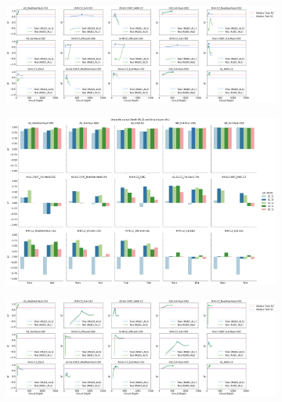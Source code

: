 \documentclass[journal=jacsat,manuscript=article]{achemso}
\begin{document}
\begin{figure}[H]
\begin{subfigure}[b]{0.49\textwidth}
		\caption{}
		\label{fig:16qubit_Quadratic_RUD_AL}
	\end{subfigure}
	\hfill
	\begin{subfigure}[b]{0.49\textwidth}
		\centering
		\includegraphics[width=\linewidth]{../images/Function_Fitting/quadratic_circuitdepth_vs_R2}
		\caption{}
		\label{fig:quadratic_circuitdepth_vs_R2}
	\end{subfigure}
	\hfill		
	\begin{subfigure}[b]{0.49\textwidth}
		\centering
		\includegraphics[width=\linewidth]{../images/Function_Fitting/sixteenqubit/16qubit_Linear_RUD_AL}
		\caption{}
		\label{fig:16qubitlinearrudal}
	\end{subfigure}	
	\hfill
	\begin{subfigure}[b]{0.49\textwidth}
		\centering
		\includegraphics[width=\linewidth]{../images/Function_Fitting/sine_circuitdepth_vs_R2}
		\caption{}
		\label{fig:sine_circuitdepth_vs_R2}
	\end{subfigure}
	\hfill		
	\caption{}
	\label{fig:16qubit_RUD_AL}	
\end{figure}
\end{document}
